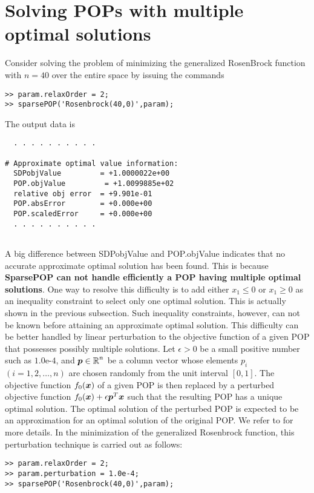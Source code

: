 \section{Solving POPs with multiple optimal solutions}
\label{multiple}

Consider solving the problem of minimizing the generalized RosenBrock function with $n=40$ 
over the entire space by issuing the commands 
\begin{verbatim}
>> param.relaxOrder = 2; 
>> sparsePOP('Rosenbrock(40,0)',param);
\end{verbatim}
The output data is 
\begin{verbatim}
  . . . . . . . . . .

# Approximate optimal value information:
  SDPobjValue         = +1.0000022e+00
  POP.objValue         = +1.0099885e+02
  relative obj error  = +9.901e-01
  POP.absError        = +0.000e+00
  POP.scaledError     = +0.000e+00
  . . . . . . . . . .
  
\end{verbatim}
A big difference between {\sf SDPobjValue} and {\sf POP.objValue} indicates that 
no accurate approximate optimal solution has been found. This is because  {\bf SparsePOP can not 
handle efficiently
a POP having multiple optimal solutions}. One way to resolve this difficulty is to add either 
$x_1 \leq 0$ or $x_1 \geq 0$ as an inequality constraint to select only one optimal solution. 
This is actually shown in the previous subsection.
Such inequality constraints, however, can  not be known before attaining an approximate 
optimal solution. This difficulty can be better handled by linear perturbation to the objective function of a given POP 
that possesses possibly multiple solutions. Let $\epsilon > 0$ be a small positive number such as $1.0$e-$4$, 
and $\p \in \Real^n$ be a column vector whose elements $p_i$ $(i=1,2,\ldots,n)$ are chosen 
randomly from the unit interval $[0,1]$. The objective function $f_0(\x)$ of a given 
POP is then replaced by a perturbed objective function $f_0(\x) + \epsilon \p^T\x$ such that the resulting POP has 
a unique optimal solution. 
The optimal solution of the perturbed POP is expected to be an approximation  for an optimal solution of the original POP. 
We refer to \cite{WAKI04} for more details. 
In the minimization of the generalized Rosenbrock function, this perturbation technique is carried out 
as follows: 
\begin{verbatim}
>> param.relaxOrder = 2; 
>> param.perturbation = 1.0e-4; 
>> sparsePOP('Rosenbrock(40,0)',param);
\end{verbatim}

